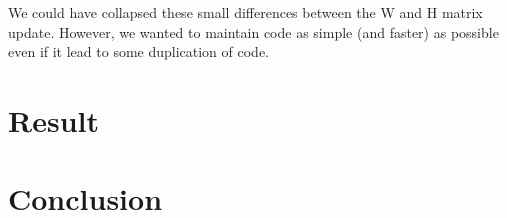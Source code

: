 \documentclass[a4paper,12pt]{article}
\begin{document}
We could have collapsed these small differences between the W and H matrix update.
However, we wanted to maintain code as simple (and faster) as possible even if it lead to some duplication of code.

\section{Result}
\label{result}

\section{Conclusion}
\label{conclusion}


\nocite{*}




\end{document}

